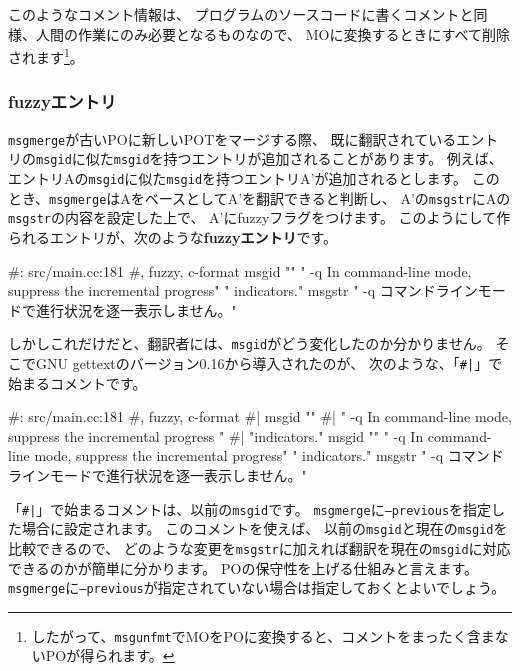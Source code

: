\documentclass[mingoth,a4paper]{jsarticle}
\begin{document}
このようなコメント情報は、
プログラムのソースコードに書くコメントと同様、人間の作業にのみ必要となるものなので、
MOに変換するときにすべて削除されます\footnote{したがって、\texttt{msgunfmt}でMOをPOに変換すると、コメントをまったく含まないPOが得られます。}。

\subsubsection{fuzzyエントリ}

\texttt{msgmerge}が古いPOに新しいPOTをマージする際、
既に翻訳されているエントリの\texttt{msgid}に似た\texttt{msgid}を持つエントリが追加されることがあります。
例えば、エントリAの\texttt{msgid}に似た\texttt{msgid}を持つエントリA'が追加されるとします。
このとき、\texttt{msgmerge}はAをベースとしてA'を翻訳できると判断し、
A'の\texttt{msgstr}にAの\texttt{msgstr}の内容を設定した上で、
A'にfuzzyフラグをつけます。
このようにして作られるエントリが、次のような{\bf fuzzyエントリ}です。

\begin{commandline}
#: src/main.cc:181
#, fuzzy, c-format
msgid ""
" -q             In command-line mode, suppress the incremental progress\n"
"                indicators.\n"
msgstr " -q                コマンドラインモードで進行状況を逐一表示しません。"
\end{commandline}

しかしこれだけだと、翻訳者には、\texttt{msgid}がどう変化したのか分かりません。
そこでGNU gettextのバージョン0.16から導入されたのが、
次のような、「\texttt{\#|}」で始まるコメントです。

\begin{commandline}
#: src/main.cc:181
#, fuzzy, c-format
#| msgid ""
#| " -q             In command-line mode, suppress the incremental progress "
#| "indicators."
msgid ""
" -q             In command-line mode, suppress the incremental progress\n"
"                indicators.\n"
msgstr " -q                コマンドラインモードで進行状況を逐一表示しません。"
\end{commandline}

「\texttt{\#|}」で始まるコメントは、以前の\texttt{msgid}です。
\texttt{msgmerge}に\texttt{--previous}を指定した場合に設定されます。
このコメントを使えば、
以前の\texttt{msgid}と現在の\texttt{msgid}を比較できるので、
どのような変更を\texttt{msgstr}に加えれば翻訳を現在の\texttt{msgid}に対応できるのかが簡単に分かります。
POの保守性を上げる仕組みと言えます。
\texttt{msgmerge}に\texttt{--previous}が指定されていない場合は指定しておくとよいでしょう。
\end{document}
